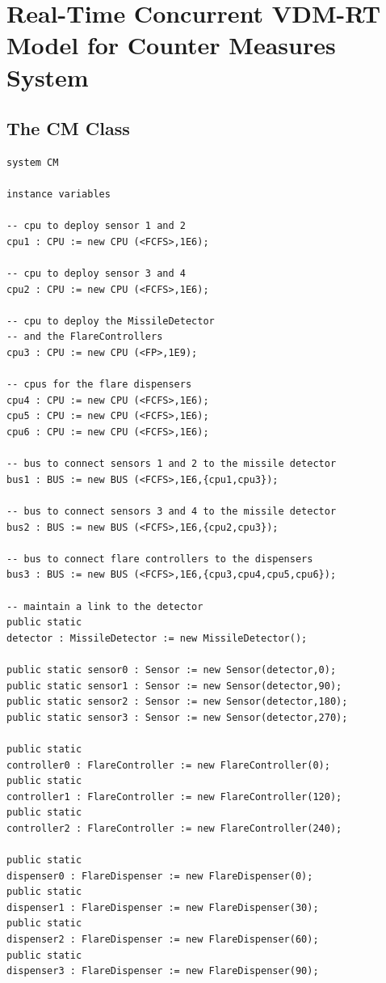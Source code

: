 \documentclass{overturerepchap}
\begin{document}
\section{Real-Time Concurrent VDM-RT Model for Counter Measures System}

\subsection{The CM Class}

\begin{lstlisting}
system CM

instance variables

-- cpu to deploy sensor 1 and 2
cpu1 : CPU := new CPU (<FCFS>,1E6);

-- cpu to deploy sensor 3 and 4
cpu2 : CPU := new CPU (<FCFS>,1E6);

-- cpu to deploy the MissileDetector
-- and the FlareControllers
cpu3 : CPU := new CPU (<FP>,1E9);

-- cpus for the flare dispensers
cpu4 : CPU := new CPU (<FCFS>,1E6);
cpu5 : CPU := new CPU (<FCFS>,1E6);
cpu6 : CPU := new CPU (<FCFS>,1E6);

-- bus to connect sensors 1 and 2 to the missile detector
bus1 : BUS := new BUS (<FCFS>,1E6,{cpu1,cpu3});

-- bus to connect sensors 3 and 4 to the missile detector
bus2 : BUS := new BUS (<FCFS>,1E6,{cpu2,cpu3});
  
-- bus to connect flare controllers to the dispensers
bus3 : BUS := new BUS (<FCFS>,1E6,{cpu3,cpu4,cpu5,cpu6});

-- maintain a link to the detector
public static 
detector : MissileDetector := new MissileDetector();

public static sensor0 : Sensor := new Sensor(detector,0);
public static sensor1 : Sensor := new Sensor(detector,90);
public static sensor2 : Sensor := new Sensor(detector,180);
public static sensor3 : Sensor := new Sensor(detector,270);

public static 
controller0 : FlareController := new FlareController(0);
public static 
controller1 : FlareController := new FlareController(120);
public static 
controller2 : FlareController := new FlareController(240);

public static 
dispenser0 : FlareDispenser := new FlareDispenser(0);
public static 
dispenser1 : FlareDispenser := new FlareDispenser(30);
public static 
dispenser2 : FlareDispenser := new FlareDispenser(60);
public static 
dispenser3 : FlareDispenser := new FlareDispenser(90);


\end{lstlisting}
\end{document}
